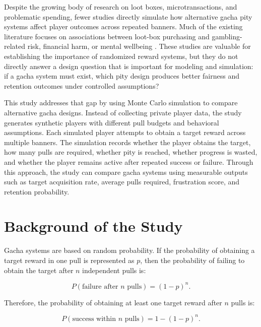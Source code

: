 \documentclass[sigconf,nonacm]{acmart}
\begin{document}
Despite the growing body of research on loot boxes, microtransactions, and problematic spending, fewer studies directly simulate how alternative gacha pity systems affect player outcomes across repeated banners. Much of the existing literature focuses on associations between loot-box purchasing and gambling-related risk, financial harm, or mental wellbeing \cite{gibson2022microtransactions,sirola2023indebtedness,gonzalez2024lootboxes}. These studies are valuable for establishing the importance of randomized reward systems, but they do not directly answer a design question that is important for modeling and simulation: if a gacha system must exist, which pity design produces better fairness and retention outcomes under controlled assumptions?

This study addresses that gap by using Monte Carlo simulation to compare alternative gacha designs. Instead of collecting private player data, the study generates synthetic players with different pull budgets and behavioral assumptions. Each simulated player attempts to obtain a target reward across multiple banners. The simulation records whether the player obtains the target, how many pulls are required, whether pity is reached, whether progress is wasted, and whether the player remains active after repeated success or failure. Through this approach, the study can compare gacha systems using measurable outputs such as target acquisition rate, average pulls required, frustration score, and retention probability.

\section{Background of the Study}

Gacha systems are based on random probability. If the probability of obtaining a target reward in one pull is represented as $p$, then the probability of failing to obtain the target after $n$ independent pulls is:

\begin{equation}
P(\text{failure after } n \text{ pulls}) = (1-p)^n.
\label{eq:failure}
\end{equation}

Therefore, the probability of obtaining at least one target reward after $n$ pulls is:

\begin{equation}
P(\text{success within } n \text{ pulls}) = 1 - (1-p)^n.
\label{eq:success}
\end{equation}
\end{document}

